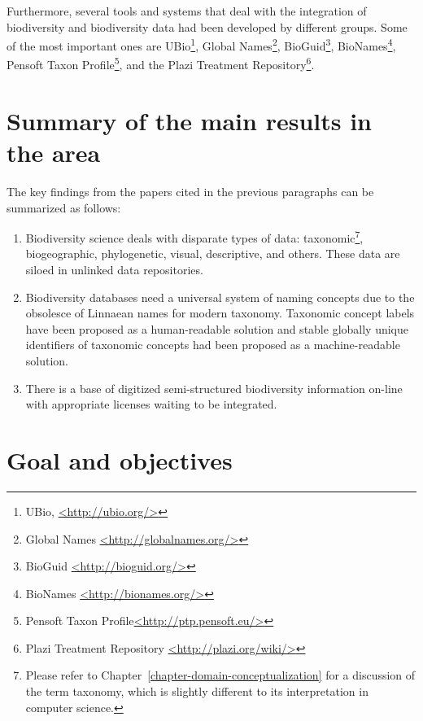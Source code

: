 {Furthermore, several tools and systems that deal with the integration of biodiversity and biodiversity data had been developed by different groups. Some of the most important ones are UBio\footnote{UBio, \href{http://ubio.org/}{<http://ubio.org/>}}, Global Names\footnote{Global Names \href{http://globalnames.org/}{<http://globalnames.org/>}}, BioGuid\footnote{BioGuid \href{http://bioguid.org/}{<http://bioguid.org/>}}, BioNames\footnote{BioNames \href{http://bionames.org/}{<http://bionames.org/>}}, Pensoft Taxon Profile\footnote{Pensoft Taxon Profile\href{http://ptp.pensoft.eu/}{<http://ptp.pensoft.eu/>}}, and the Plazi Treatment Repository\footnote{Plazi Treatment Repository \href{http://plazi.org/wiki/}{<http://plazi.org/wiki/>}}.


\section{Summary of the main results in the area}

The key findings from the papers cited in the previous paragraphs can be summarized as follows:

\begin{enumerate}
  
\item{Biodiversity science deals with disparate types of data: taxonomic\footnote{Please refer to Chapter~\ref{chapter-domain-conceptualization} for a discussion of the term taxonomy, which is slightly different to its interpretation in computer science.}, biogeographic, phylogenetic, visual, descriptive, and others. These data are siloed in unlinked data repositories.}
  
\item{Biodiversity databases need a universal system of naming concepts due to the obsolesce of Linnaean names for modern taxonomy. Taxonomic concept labels have been proposed as a human-readable solution and stable globally unique identifiers of taxonomic concepts had been proposed as a machine-readable solution.}
\item{There is a base of digitized semi-structured biodiversity information on-line with appropriate licenses waiting to be integrated.}
\end{enumerate}


\section{Goal and objectives}

}
